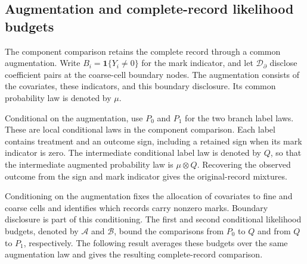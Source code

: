 \documentclass[11pt]{article}
\begin{document}
\subsection{Augmentation and complete-record likelihood budgets}

The component comparison retains the complete record through a common augmentation. Write \(B_i=\mathbf1\{Y_i\ne0\}\) for the mark indicator, and let \(\mathcal D_{\partial}\) disclose coefficient pairs at the coarse-cell boundary nodes. The augmentation consists of the covariates, these indicators, and this boundary disclosure. Its common probability law is denoted by \(\mu\).

Conditional on the augmentation, use \(P_0\) and \(P_1\) for the two branch label laws. These are local conditional laws in the component comparison. Each label contains treatment and an outcome sign, including a retained sign when its mark indicator is zero. The intermediate conditional label law is denoted by \(Q\), so that the intermediate augmented probability law is \(\mu\otimes Q\). Recovering the observed outcome from the sign and mark indicator gives the original-record mixtures.

Conditioning on the augmentation fixes the allocation of covariates to fine and coarse cells and identifies which records carry nonzero marks. Boundary disclosure is part of this conditioning. The first and second conditional likelihood budgets, denoted by \(\mathcal A\) and \(\mathcal B\), bound the comparisons from \(P_0\) to \(Q\) and from \(Q\) to \(P_1\), respectively. The following result averages these budgets over the same augmentation law and gives the resulting complete-record comparison.
\end{document}
